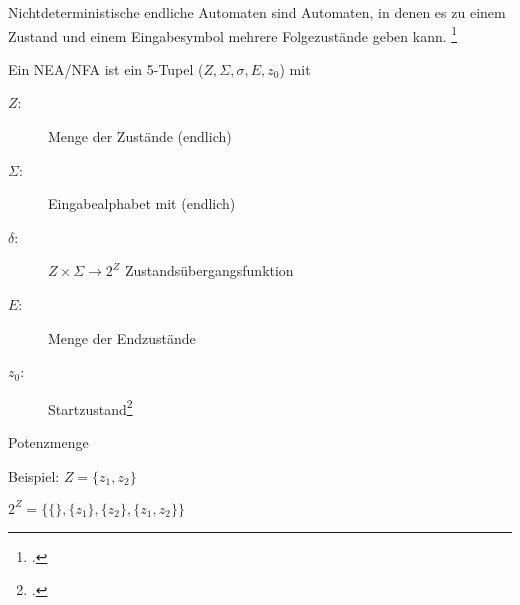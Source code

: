 \documentclass{lehramt-informatik-haupt}
\begin{document}
Nichtdeterministische endliche Automaten sind Automaten, in denen es zu
einem Zustand und einem Eingabesymbol mehrere Folgezustände geben kann.
\footcite[Seite 28]{vossen}

Ein NEA/NFA ist ein 5-Tupel ($Z, \Sigma, \sigma, E, z_0$) mit

\begin{description}
\item[$Z$:] Menge der Zustände (endlich)
\item[$\Sigma$:] Eingabealphabet mit (endlich)
\item[$\delta$:] $Z \times \Sigma \rightarrow 2^Z$ Zustandsübergangsfunktion
\item[$E$:] Menge der Endzustände
\item[$z_0$:] Startzustand\footcite[Seite 30]{theoinf:fs:1}
\end{description}

Potenzmenge

Beispiel: $Z = \{z_1, z_2\}$

$2^Z = \{\{\}, \{z_1 \}, \{z_2 \}, \{z_1 , z_2 \}\}$

\literatur
\end{document}
